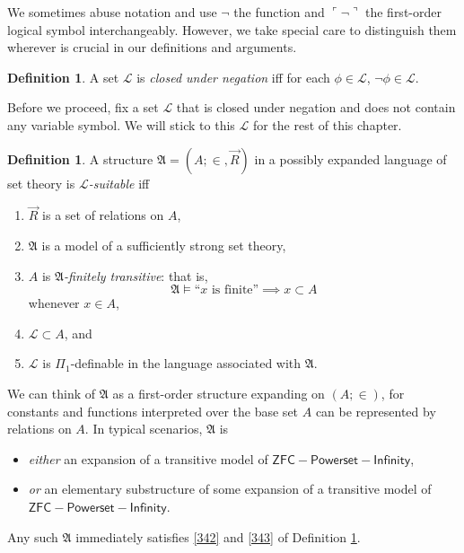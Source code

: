 \documentclass[12pt, twoside]{memoir}
\numberwithin{equation}{section}
\theoremstyle{definition}
\newtheorem{defi}[thm]{Definition}
\theoremstyle{remark}
\theoremstyle{definition}
\theoremstyle{definition}
\theoremstyle{definition}
\theoremstyle{remark}
\begin{document}
We sometimes abuse notation and use $\neg$ the function and $\ulcorner \neg \urcorner$ the first-order logical symbol interchangeably. However, we take special care to distinguish them wherever is crucial in our definitions and arguments.

\begin{defi}
A set $\mathcal{L}$ is \emph{closed under negation} iff for each $\phi \in \mathcal{L}$, $\neg \phi \in \mathcal{L}$.
\end{defi}

Before we proceed, fix a set $\mathcal{L}$ that is closed under negation and does not contain any variable symbol. We will stick to this $\mathcal{L}$ for the rest of this chapter.

\begin{defi}\label{lsuitable}
A structure $\mathfrak{A} = (A; \in, \Vec{R})$ in a possibly expanded language of set theory is $\mathcal{L}$\emph{-suitable} iff
\begin{enumerate}[label=(\alph*)]
    \item $\Vec{R}$ is a set of relations on $A$,
    \item\label{342} $\mathfrak{A}$ is a model of a sufficiently strong set theory,
    \item\label{343} $A$ is $\mathfrak{A}$\emph{-finitely transitive}: that is, 
    \begin{equation*}
        \mathfrak{A} \models \text{``} x \text{ is finite''} \implies x \subset A 
    \end{equation*}
    whenever $x \in A$, 
    \item $\mathcal{L} \subset A$, and
    \item $\mathcal{L}$ is $\Pi_1$-definable in the language associated with $\mathfrak{A}$.
\end{enumerate}
\end{defi}

We can think of $\mathfrak{A}$ as a first-order structure expanding on $(A; \in)$, for constants and functions interpreted over the base set $A$ can be represented by relations on $A$. In typical scenarios, $\mathfrak{A}$ is
\begin{itemize}
    \item \emph{either} an expansion of a transitive model of $\mathsf{ZFC - Powerset - Infinity}$,
    \item \emph{or} an elementary substructure of some expansion of a transitive model of \\ $\mathsf{ZFC - Powerset - Infinity}$.
\end{itemize} 
Any such $\mathfrak{A}$ immediately satisfies \ref{342} and \ref{343} of Definition \ref{lsuitable}. 
\end{document}
